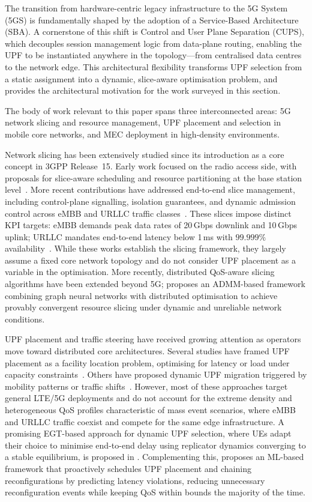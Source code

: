 \documentclass[conference]{IEEEtran}
\begin{document}
The transition from hardware-centric legacy infrastructure to the
5G System (5GS) is fundamentally shaped by the adoption of a
Service-Based Architecture (SBA). A cornerstone of this shift is
Control and User Plane Separation (CUPS), which decouples session
management logic from data-plane routing, enabling the UPF to be
instantiated anywhere in the topology---from centralised data
centres to the network edge. This architectural flexibility
transforms UPF selection from a static assignment into a dynamic,
slice-aware optimisation problem, and provides the architectural
motivation for the work surveyed in this section.

The body of work relevant to this paper spans three interconnected
areas: 5G network slicing and resource management, UPF placement
and selection in mobile core networks, and MEC deployment in
high-density environments.

Network slicing has been extensively studied since its introduction
as a core concept in 3GPP Release~15. Early work focused on the
radio access side, with proposals for slice-aware scheduling and
resource partitioning at the base station
level~\cite{zhang2019network}. More recent contributions have
addressed end-to-end slice management, including control-plane
signalling, isolation guarantees, and dynamic admission control
across eMBB and URLLC traffic
classes~\cite{popovski2018wireless}. These slices impose distinct
KPI targets: eMBB demands peak data rates of 20\,Gbps downlink
and 10\,Gbps uplink; URLLC mandates end-to-end latency below
1\,ms with $99.999\%$ availability~\cite{3gpp_ts22261}.
While these works establish the slicing framework, they largely
assume a fixed core network topology and do not consider UPF
placement as a variable in the optimisation. More recently,
distributed QoS-aware slicing algorithms have been extended beyond
5G; \cite{Asheralieva2024slicing} proposes an ADMM-based framework
combining graph neural networks with distributed optimisation to
achieve provably convergent resource slicing under dynamic and
unreliable network conditions.

UPF placement and traffic steering have received growing attention
as operators move toward distributed core architectures. Several
studies have framed UPF placement as a facility location problem,
optimising for latency or load under capacity
constraints~\cite{Goshi2024upf}. Others have proposed dynamic UPF
migration triggered by mobility patterns or traffic
shifts~\cite{sama2016software}. However, most of these approaches
target general LTE/5G deployments and do not account for the
extreme density and heterogeneous QoS profiles characteristic of
mass event scenarios, where eMBB and URLLC traffic coexist
and compete for the same edge infrastructure. A promising
EGT-based approach for dynamic UPF selection, where UEs adapt
their choice to minimise end-to-end delay using replicator dynamics
converging to a stable equilibrium, is proposed in
\cite{Alevizaki2021upf}. Complementing this, \cite{LeyvaUPC2023}
proposes an ML-based framework that proactively schedules UPF
placement and chaining reconfigurations by predicting latency
violations, reducing unnecessary reconfiguration events while
keeping QoS within bounds the majority of the time.
\end{document}
